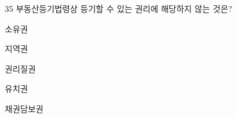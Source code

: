 \begin{question}{35}
부동산등기법령상 등기할 수 있는 권리에 해당하지 않는 것은?
\begin{choices}
  \item 소유권
  \item 지역권
  \item 권리질권
  \item 유치권
  \item 채권담보권
\end{choices}
\end{question}
